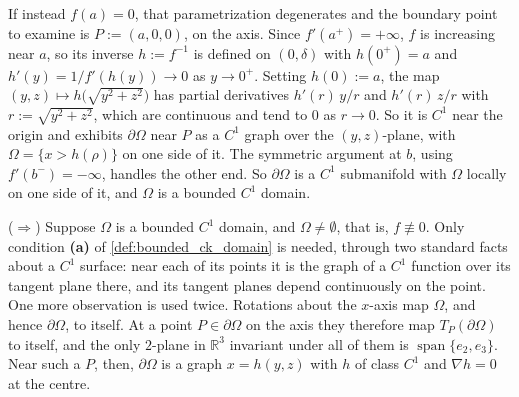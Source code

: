 \begin{exercisesolution}
\begin{enumerate}[label=\textbf{(\alph*)}]
    If instead $f(a)=0$, that parametrization degenerates and the boundary point to examine is
    $P := (a,0,0)$, on the axis. Since $f'(a^+)=+\infty$, $f$ is increasing near $a$, so its
    inverse $h := f^{-1}$ is defined on $(0,\delta)$ with $h(0^+) = a$ and
    $h'(y) = 1/f'(h(y)) \to 0$ as $y \to 0^+$. Setting $h(0) := a$, the map
    $(y,z) \mapsto h\big(\sqrt{y^2+z^2}\big)$ has partial derivatives $h'(r)\,y/r$ and
    $h'(r)\,z/r$ with $r := \sqrt{y^2+z^2}$, which are continuous and tend to $0$ as $r \to 0$.
    So it is $C^1$ near the origin and exhibits $\partial\Omega$ near $P$ as a $C^1$ graph over
    the $(y,z)$-plane, with $\Omega = \{x > h(\rho)\}$ on one side of it. The symmetric argument
    at $b$, using $f'(b^-)=-\infty$, handles the other end. So $\partial\Omega$ is a $C^1$
    submanifold with $\Omega$ locally on one side of it, and $\Omega$ is a bounded $C^1$ domain.

    ($\Rightarrow$) Suppose $\Omega$ is a bounded $C^1$ domain, and $\Omega \neq \emptyset$, that
    is, $f \not\equiv 0$. Only condition \textbf{(a)} of \cref{def:bounded_ck_domain} is needed,
    through two standard facts about a $C^1$ surface: near each of its points it is the graph of
    a $C^1$ function over its tangent plane there, and its tangent planes depend continuously on
    the point. One more observation is used twice. Rotations about the $x$-axis map $\Omega$, and
    hence $\partial\Omega$, to itself. At a point $P \in \partial\Omega$ on the axis they therefore
    map $T_P(\partial\Omega)$ to itself, and the only $2$-plane in $\mathbb{R}^3$ invariant under
    all of them is $\operatorname{span}\{e_2,e_3\}$. Near such a $P$, then, $\partial\Omega$ is a
    graph $x = h(y,z)$ with $h$ of class $C^1$ and $\nabla h = 0$ at the centre.


\end{enumerate}
\end{exercisesolution}
